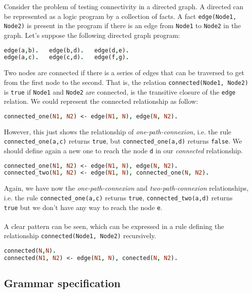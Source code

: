 \documentclass{report}
\theoremstyle{definition}
\theoremstyle{definition}
\newcommand{\ttt}[1]{\texttt{#1}}
\begin{document}
Consider the problem of testing connectivity in a directed graph. A directed can be represented as a logic program by a collection of facts. A fact \ttt{edge(Node1, Node2)} is present in the program if there is an edge from \ttt{Node1} to \ttt{Node2} in the graph. Let's suppose the following directed graph program:
\begin{lstlisting}[language=Prolog, caption=A direct graph]
edge(a,b).   edge(b,d).   edge(d,e).
edge(a,c).   edge(c,d).   edge(f,g).
\end{lstlisting}
Two nodes are connected if there is a series of edges that can be traversed to get from the first node to the second. That is, the relation \ttt{connected(Node1, Node2)} is \ttt{true} if \ttt{Node1} and \ttt{Node2} are connected, is the transitive closure of the \ttt{edge} relation. We could represent the connected relationship as follow:
\begin{lstlisting}[language=Prolog, caption=Connected relationship]
connected_one(N1, N2) <- edge(N1, N), edge(N, N2).
\end{lstlisting}
However, this just shows the relationship of \textit{one-path-connexion}, i.e. the rule \ttt{connected\_one(a,c)} returns \ttt{true}, but \ttt{connected\_one(a,d)} returns \ttt{false}. We should define again a new one to reach the node \ttt{d} in our \textit{connected} relationship.
\begin{lstlisting}[language=Prolog, caption=Connected relationship]
connected_one(N1, N2) <- edge(N1, N), edge(N, N2).
connected_two(N1, N2) <- edge(N1, N), connected_one(N, N2).
\end{lstlisting}
Again, we have now the \textit{one-path-connexion} and \textit{two-path-connexion} relationships, i.e. the rule \ttt{connected\_one(a,c)} returns \ttt{true}, \ttt{connected\_two(a,d)} returns \ttt{true} but we don't have any way to reach the node \ttt{e}.\\\\
A clear pattern can be seen, which can be expressed in a rule defining the relationship \ttt{connected(Node1, Node2)} recursively.
\begin{lstlisting}[language=Prolog, caption=Generalization of the connected relationship]
connected(N,N).
connected(N1, N2) <- edge(N1, N), conected(N, N2).
\end{lstlisting}

\subsection{Grammar specification}
\end{document}

